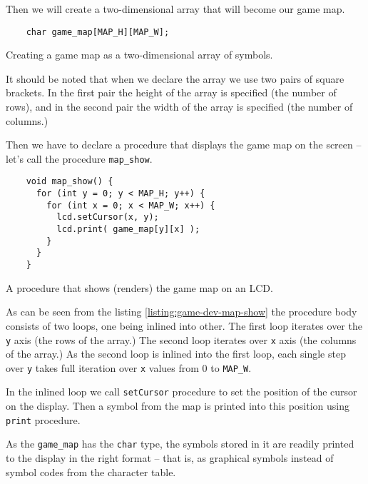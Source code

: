 \documentclass[../sparc.tex]{subfiles}
\begin{document}
Then we will create a two-dimensional array that will become our game map.

\begin{listing}[H]
  \begin{verbatim}
    char game_map[MAP_H][MAP_W];
  \end{verbatim}
  \caption{Creating a game map as a two-dimensional array of symbols.}
  \label{listing:game-dev-map-array}
\end{listing}

It should be noted that when we declare the array we use two pairs of square
brackets.  In the first pair the height of the array is specified (the number of
rows), and in the second pair the width of the array is specified (the number of
columns.)

Then we have to declare a procedure that displays the game map on the screen --
let's call the procedure \texttt{map_show}.

\begin{listing}[ht]
  \begin{verbatim}
    void map_show() {
      for (int y = 0; y < MAP_H; y++) {
        for (int x = 0; x < MAP_W; x++) {
          lcd.setCursor(x, y);
          lcd.print( game_map[y][x] );
        }
      }
    }
  \end{verbatim}
  \caption{A procedure that shows (renders) the game map on an LCD.}
  \label{listing:game-dev-map-show}
\end{listing}

As can be seen from the listing \ref{listing:game-dev-map-show} the procedure
body consists of two loops, one being inlined into other.  The first loop
iterates over the \texttt{y} axis (the rows of the array.)  The second
loop iterates over \texttt{x} axis (the columns of the array.)  As the
second loop is inlined into the first loop, each single step over
\texttt{y} takes full iteration over \texttt{x} values from 0
to \texttt{MAP_W}.

In the inlined loop we call \texttt{setCursor} procedure to set the
position of the cursor on the display.  Then a symbol from the map is printed
into this position using \texttt{print} procedure.

As the \texttt{game_map} has the \texttt{char} type, the
symbols stored in it are readily printed to the display in the right format --
that is, as graphical symbols instead of symbol codes from the character table.
\end{document}
